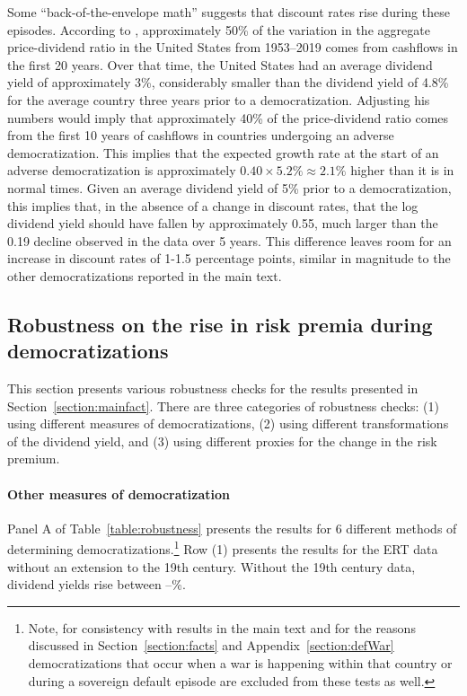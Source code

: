 \documentclass[12pt]{article}
\numberwithin{equation}{section}
\begin{document}
Some ``back-of-the-envelope math'' suggests that discount rates rise during these episodes. According to \cite{Goncalves2022}, approximately 50\% of the variation in the aggregate price-dividend ratio in the United States from 1953--2019 comes from cashflows in the first 20 years. Over that time, the United States had an average dividend yield of approximately 3\%, considerably smaller than the dividend yield of 4.8\% for the average country three years prior to a democratization. Adjusting his numbers would imply that approximately 40\% of the price-dividend ratio comes from the first 10 years of cashflows in countries undergoing an adverse democratization. This implies that the expected growth rate at the start of an adverse democratization is approximately $0.40 \times 5.2\% \approx 2.1\%$ higher than it is in normal times. Given an average dividend yield of 5\% prior to a democratization, this implies that, in the absence of a change in discount rates, that the log dividend yield should have fallen by approximately 0.55, much larger than the 0.19 decline observed in the data over 5 years. This difference leaves room for an increase in discount rates of 1-1.5 percentage points,  similar in magnitude to the other democratizations reported in the main text.

\subsection{Robustness on the rise in risk premia during democratizations}\label{section:robustness}

This section presents various robustness checks for the results presented in Section~\ref{section:mainfact}. There are three categories of robustness checks: (1) using different measures of democratizations, (2) using different transformations of the dividend yield, and (3) using different proxies for the change in the risk premium.

\paragraph{Other measures of democratization}
Panel A of Table~\ref{table:robustness} presents the results for 6 different methods of determining democratizations.\footnote{Note, for consistency with results in the main text and for the reasons discussed in Section~\ref{section:facts} and Appendix~\ref{section:defWar} democratizations that occur when a war is happening within that country or during a sovereign default episode are excluded from these tests as well.} Row (1) presents the results for the ERT data without an extension to the 19th century. Without the 19th century data, dividend yields rise between \tabBThreeERTOnlyLow\---\tabBThreeERTOnlyHigh\%. 
\end{document}
